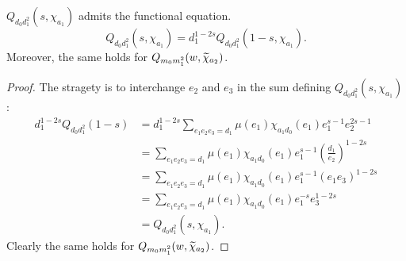     \begin{theorem}\label{NFthm:functional_equation_correction_polynomials}
        $Q_{d_{0}d_{1}^{2}}(s,\chi_{a_{1}})$ admits the functional equation.
        \[
            Q_{d_{0}d_{1}^{2}}(s,\chi_{a_{1}}) = d_{1}^{1-2s}Q_{d_{0}d_{1}^{2}}(1-s,\chi_{a_{1}}).
        \]
        Moreover, the same holds for $Q_{m_{0}m_{1}^{2}}(w,\widetilde{\chi}_{a_{2}})$.
    \end{theorem}
    \begin{proof}
        The stragety is to interchange $e_{2}$ and $e_{3}$ in the sum defining $Q_{d_{0}d_{1}^{2}}(s,\chi_{a_{1}})$:
        \begin{align*}
            d_{1}^{1-2s}Q_{d_{0}d_{1}^{2}}(1-s) &= d_{1}^{1-2s}\sum_{e_{1}e_{2}e_{3} = d_{1}}\mu(e_{1})\chi_{a_{1}d_{0}}(e_{1})e_{1}^{s-1}e_{2}^{2s-1} \\
            &= \sum_{e_{1}e_{2}e_{3} = d_{1}}\mu(e_{1})\chi_{a_{1}d_{0}}(e_{1})e_{1}^{s-1}\left(\frac{d_{1}}{e_{2}}\right)^{1-2s} \\
            &= \sum_{e_{1}e_{2}e_{3} = d_{1}}\mu(e_{1})\chi_{a_{1}d_{0}}(e_{1})e_{1}^{s-1}(e_{1}e_{3})^{1-2s} \\
            &= \sum_{e_{1}e_{2}e_{3} = d_{1}}\mu(e_{1})\chi_{a_{1}d_{0}}(e_{1})e_{1}^{-s}e_{3}^{1-2s} \\
            &= Q_{d_{0}d_{1}^{2}}(s,\chi_{a_{1}}).
        \end{align*}
        Clearly the same holds for $Q_{m_{0}m_{1}^{2}}(w,\widetilde{\chi}_{a_{2}})$.
    \end{proof}

